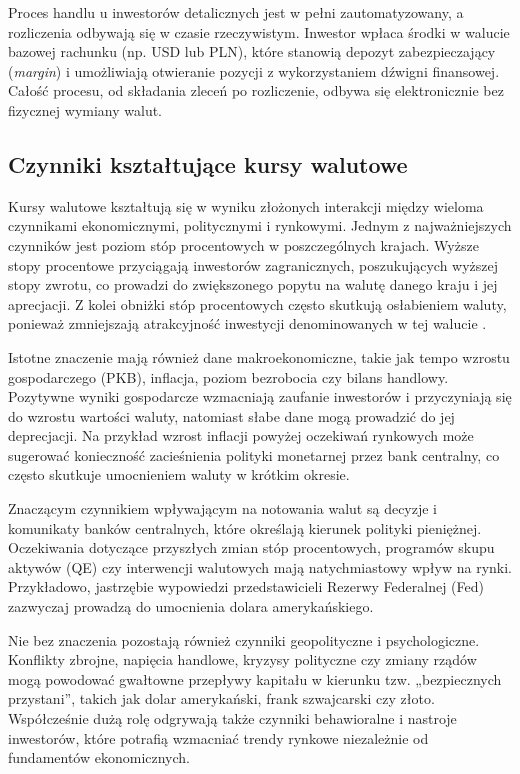 Proces handlu u inwestorów detalicznych jest w pełni zautomatyzowany, a rozliczenia odbywają się w czasie rzeczywistym. 
Inwestor wpłaca środki w walucie bazowej rachunku (np. USD lub PLN), które stanowią depozyt zabezpieczający (\textit{margin}) i umożliwiają otwieranie pozycji z wykorzystaniem dźwigni finansowej. 
Całość procesu, od składania zleceń po rozliczenie, odbywa się elektronicznie bez fizycznej wymiany walut.

\subsection{Czynniki kształtujące kursy walutowe}

Kursy walutowe kształtują się w wyniku złożonych interakcji między wieloma czynnikami ekonomicznymi, politycznymi i rynkowymi. 
Jednym z najważniejszych czynników jest poziom stóp procentowych w poszczególnych krajach. 
Wyższe stopy procentowe przyciągają inwestorów zagranicznych, poszukujących wyższej stopy zwrotu, co prowadzi do zwiększonego popytu na walutę danego kraju i jej aprecjacji. 
Z kolei obniżki stóp procentowych często skutkują osłabieniem waluty, ponieważ zmniejszają atrakcyjność inwestycji denominowanych w tej walucie \parencite{madura2018}.

Istotne znaczenie mają również dane makroekonomiczne, takie jak tempo wzrostu gospodarczego (PKB), inflacja, poziom bezrobocia czy bilans handlowy. 
Pozytywne wyniki gospodarcze wzmacniają zaufanie inwestorów i przyczyniają się do wzrostu wartości waluty, natomiast słabe dane mogą prowadzić do jej deprecjacji. 
Na przykład wzrost inflacji powyżej oczekiwań rynkowych może sugerować konieczność zacieśnienia polityki monetarnej przez bank centralny, co często skutkuje umocnieniem waluty w krótkim okresie.

Znaczącym czynnikiem wpływającym na notowania walut są decyzje i komunikaty banków centralnych, które określają kierunek polityki pieniężnej. 
Oczekiwania dotyczące przyszłych zmian stóp procentowych, programów skupu aktywów (QE) czy interwencji walutowych mają natychmiastowy wpływ na rynki. 
Przykładowo, jastrzębie wypowiedzi przedstawicieli Rezerwy Federalnej (Fed) zazwyczaj prowadzą do umocnienia dolara amerykańskiego.

Nie bez znaczenia pozostają również czynniki geopolityczne i psychologiczne. 
Konflikty zbrojne, napięcia handlowe, kryzysy polityczne czy zmiany rządów mogą powodować gwałtowne przepływy kapitału w kierunku tzw. „bezpiecznych przystani”, 
takich jak dolar amerykański, frank szwajcarski czy złoto. 
Współcześnie dużą rolę odgrywają także czynniki behawioralne i nastroje inwestorów, które potrafią wzmacniać trendy rynkowe niezależnie od fundamentów ekonomicznych.

